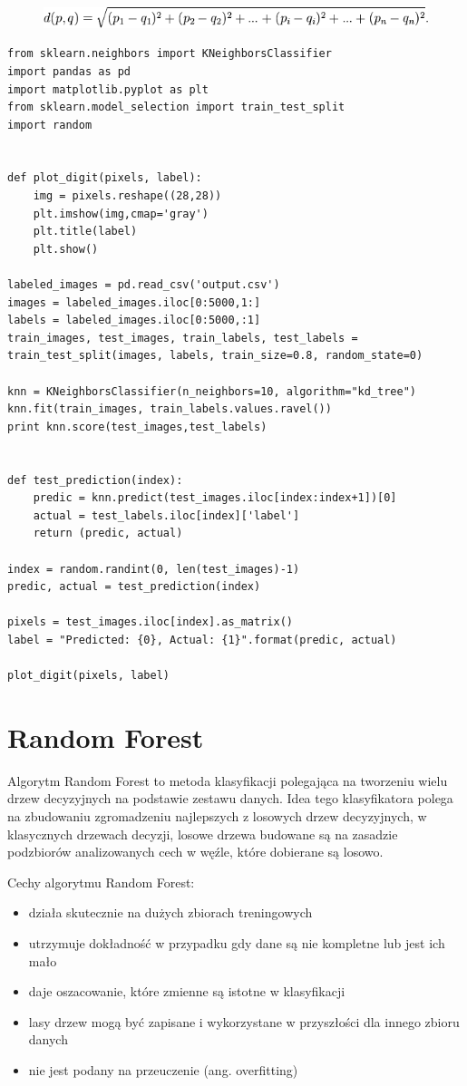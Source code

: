 \documentclass[brudnopis]{xmgr}
\begin{document}
\begin{figure}[!tbh]
\centering
\includegraphics[width=.8\hsize]{fig/knn-wzor}
\end{figure}

\lstset{language=Python} 
\begin{lstlisting}
from sklearn.neighbors import KNeighborsClassifier
import pandas as pd
import matplotlib.pyplot as plt
from sklearn.model_selection import train_test_split
import random


def plot_digit(pixels, label):
    img = pixels.reshape((28,28))
    plt.imshow(img,cmap='gray')
    plt.title(label)
    plt.show()

labeled_images = pd.read_csv('output.csv')
images = labeled_images.iloc[0:5000,1:]
labels = labeled_images.iloc[0:5000,:1]
train_images, test_images, train_labels, test_labels = train_test_split(images, labels, train_size=0.8, random_state=0)

knn = KNeighborsClassifier(n_neighbors=10, algorithm="kd_tree")
knn.fit(train_images, train_labels.values.ravel())
print knn.score(test_images,test_labels)


def test_prediction(index):
    predic = knn.predict(test_images.iloc[index:index+1])[0]
    actual = test_labels.iloc[index]['label']
    return (predic, actual)

index = random.randint(0, len(test_images)-1)
predic, actual = test_prediction(index)

pixels = test_images.iloc[index].as_matrix()
label = "Predicted: {0}, Actual: {1}".format(predic, actual)

plot_digit(pixels, label)
\end{lstlisting}

\section{Random Forest}

Algorytm Random Forest to metoda klasyfikacji polegająca na tworzeniu wielu drzew decyzyjnych na podstawie zestawu danych. Idea tego klasyfikatora polega na zbudowaniu zgromadzeniu najlepszych z losowych drzew decyzyjnych, w klasycznych drzewach decyzji, losowe drzewa budowane są na zasadzie podzbiorów analizowanych cech w węźle, które dobierane są losowo.

Cechy algorytmu Random Forest:
\begin{itemize}
\item
działa skutecznie na dużych zbiorach treningowych
\item
utrzymuje dokładność w przypadku gdy dane są nie kompletne lub jest ich mało
\item
daje oszacowanie, które zmienne są istotne w klasyfikacji
\item
lasy drzew mogą być zapisane i wykorzystane w przyszłości dla innego zbioru danych
\item
nie jest podany na przeuczenie (ang. overfitting)
\end{itemize}
\end{document}
